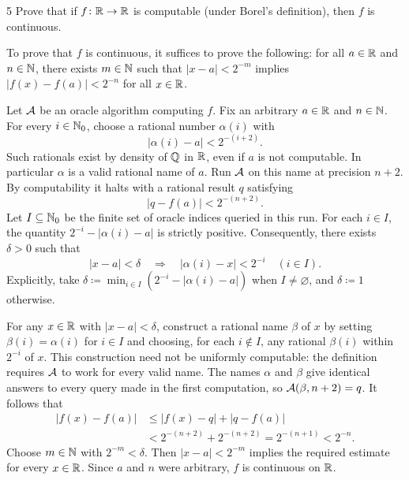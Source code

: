 \documentclass[11pt, oneside]{article}
\begin{document}
\begin{problem}{5}
Prove that if $f\colon\mathbb{R}\to\mathbb{R}$ is computable (under Borel's definition),
then $f$ is continuous.

\begin{hint}
To prove that $f$ is continuous, it suffices to prove the
following: for all $a\in\mathbb{R}$ and $n\in\mathbb{N}$, there exists $m\in\mathbb{N}$ such that
$|x-a|<2^{-m}$ implies $|f(x)-f(a)|<2^{-n}$ for all $x\in\mathbb{R}$.
\end{hint}
\end{problem}

\begin{solution}
Let $\mathcal{A}$ be an oracle algorithm computing $f$. Fix an arbitrary
$a\in\mathbb{R}$ and $n\in\mathbb{N}$. For every $i\in\mathbb{N}_0$, choose a rational
number $\alpha(i)$ with
\[
       |\alpha(i)-a|<2^{-(i+2)}.
\]
Such rationals exist by density of $\mathbb{Q}$ in $\mathbb{R}$, even if $a$ is not
computable. In particular $\alpha$ is a valid rational name of $a$.
Run $\mathcal{A}$ on this name at precision $n+2$. By computability it halts
with a rational result $q$ satisfying
\[
      |q-f(a)|<2^{-(n+2)}.
\]
Let $I\subseteq\mathbb{N}_0$ be the finite set of oracle indices queried
in this run. For each $i\in I$, the quantity
$2^{-i}-|\alpha(i)-a|$ is strictly positive. Consequently, there
exists $\delta>0$ such that
\[
     |x-a|<\delta
     \quad\Longrightarrow\quad
     |\alpha(i)-x|<2^{-i}\quad(i\in I).
\]
Explicitly, take
$\delta\coloneqq\min_{i\in I}(2^{-i}-|\alpha(i)-a|)$
when $I\ne\varnothing$, and $\delta\coloneqq1$ otherwise.

For any $x\in\mathbb{R}$ with $|x-a|<\delta$, construct a rational name
$\beta$ of $x$ by setting $\beta(i)=\alpha(i)$ for $i\in I$
and choosing, for each $i\notin I$, any rational $\beta(i)$
within $2^{-i}$ of $x$.
This construction need not be uniformly computable: the definition
requires $\mathcal{A}$ to work for every valid name.
The names $\alpha$ and $\beta$ give identical answers to every
query made in the first computation, so $\mathcal{A}(\beta, n+2)=q$.
It follows that
\begin{align*}
 |f(x)-f(a)|
  &\le |f(x)-q|+|q-f(a)|\\
  &<2^{-(n+2)}+2^{-(n+2)}=2^{-(n+1)}<2^{-n}.
\end{align*}
Choose $m\in\mathbb{N}$ with $2^{-m}<\delta$. Then
$|x-a|<2^{-m}$ implies the required estimate for every
$x\in\mathbb{R}$. Since $a$ and $n$ were arbitrary, $f$ is continuous
on $\mathbb{R}$.
\end{solution}
\end{document}
